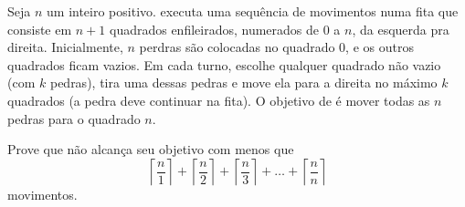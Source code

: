 Seja $n$ um inteiro positivo.
 executa uma sequência de movimentos numa fita que consiste em $n + 1$ quadrados enfileirados, numerados de $0$ a $n$, da esquerda pra direita.
Inicialmente, $n$ perdras são colocadas no quadrado $0$, e os outros quadrados ficam vazios. Em cada turno,  escolhe qualquer quadrado não vazio (com $k$ pedras), tira uma dessas pedras e move ela para a direita no máximo $k$ quadrados (a pedra deve continuar na fita). 
O objetivo de  é mover todas as $n$ pedras para o quadrado $n$.

Prove que  não alcança seu objetivo com menos que 
\[ \left \lceil \frac{n}{1} \right \rceil + \left \lceil \frac{n}{2} \right \rceil + \left \lceil \frac{n}{3} \right \rceil + \dots + \left \lceil \frac{n}{n} \right \rceil \]
movimentos.
